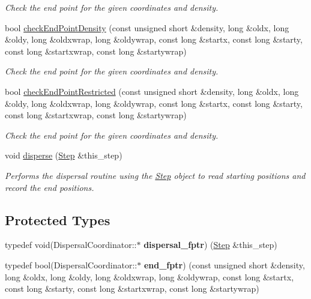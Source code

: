 \begin{DoxyCompactItemize}
\begin{DoxyCompactList}\small\item\em Check the end point for the given coordinates and density. \end{DoxyCompactList}\item 
bool \hyperlink{class_dispersal_coordinator_aaab9664c5889140a2cde9fe65e9afdde}{check\+End\+Point\+Density} (const unsigned short \&density, long \&oldx, long \&oldy, long \&oldxwrap, long \&oldywrap, const long \&startx, const long \&starty, const long \&startxwrap, const long \&startywrap)
\begin{DoxyCompactList}\small\item\em Check the end point for the given coordinates and density. \end{DoxyCompactList}\item 
bool \hyperlink{class_dispersal_coordinator_a9d3ea15093893cde7e73f8be32532e2d}{check\+End\+Point\+Restricted} (const unsigned short \&density, long \&oldx, long \&oldy, long \&oldxwrap, long \&oldywrap, const long \&startx, const long \&starty, const long \&startxwrap, const long \&startywrap)
\begin{DoxyCompactList}\small\item\em Check the end point for the given coordinates and density. \end{DoxyCompactList}\item 
void \hyperlink{class_dispersal_coordinator_a08e7c2e1882bd2f83ffd33eed2491fa0}{disperse} (\hyperlink{struct_step}{Step} \&this\+\_\+step)
\begin{DoxyCompactList}\small\item\em Performs the dispersal routine using the \hyperlink{struct_step}{Step} object to read starting positions and record the end positions. \end{DoxyCompactList}\end{DoxyCompactItemize}
\subsection*{Protected Types}
\begin{DoxyCompactItemize}
\item 
typedef void(Dispersal\+Coordinator\+::$\ast$ {\bfseries dispersal\+\_\+fptr}) (\hyperlink{struct_step}{Step} \&this\+\_\+step)\hypertarget{class_dispersal_coordinator_a95a865c016904f23990926af1e7534da}{}\label{class_dispersal_coordinator_a95a865c016904f23990926af1e7534da}

\item 
typedef bool(Dispersal\+Coordinator\+::$\ast$ {\bfseries end\+\_\+fptr}) (const unsigned short \&density, long \&oldx, long \&oldy, long \&oldxwrap, long \&oldywrap, const long \&startx, const long \&starty, const long \&startxwrap, const long \&startywrap)\hypertarget{class_dispersal_coordinator_a0f3665392afbd92bfbc0ef14a06a6b64}{}\label{class_dispersal_coordinator_a0f3665392afbd92bfbc0ef14a06a6b64}

\end{DoxyCompactItemize}
